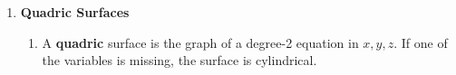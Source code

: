 \documentclass[10pt]{article}
\begin{document}
\begin{multicols*}{2}
\begin{enumerate}
\item \textbf{Quadric Surfaces}
\begin{enumerate}
    \item A \textbf{quadric} surface is the graph of a degree-2 equation in $x,y,z$. If one of the variables is missing, the surface is cylindrical.
    

\end{enumerate}
\end{enumerate}
\end{multicols*}
\end{document}
